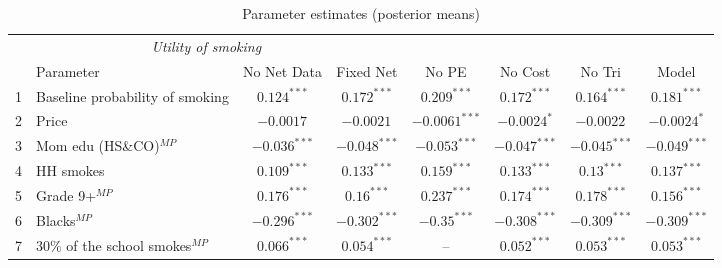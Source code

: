 
\begin{table}[t!]
\begin{center}
\caption{Parameter estimates (posterior means)} \label{tab:estimates}
\hspace*{-1cm}
\begin{small}
\begin{tabular}{llcccccc}
\hline \hline
\multicolumn{4}{c}{\textit{Utility of smoking}}  \\
   & Parameter   & No Net Data   & Fixed Net   & No PE   & No Cost  & No Tri   & Model  \\ \hline
  1 &Baseline probability of smoking          & $0.124^{***}$ & $0.172^{***}$ & $0.209^{***}$ & $0.172^{***}$ & $0.164^{***}$ & $0.181^{***}$ \\ 
  2 &Price                                    &  $-0.0017^{}$ &  $-0.0021^{}$ &$-0.0061^{***}$ & $-0.0024^{*}$ &  $-0.0022^{}$ & $-0.0024^{*}$ \\ 
  3 &Mom edu (HS\&CO)$^{MP}$                  &$-0.036^{***}$ &$-0.048^{***}$ &$-0.053^{***}$ &$-0.047^{***}$ &$-0.045^{***}$ &$-0.049^{***}$ \\ 
  4 &HH smokes                                & $0.109^{***}$ & $0.133^{***}$ & $0.159^{***}$ & $0.133^{***}$ &  $0.13^{***}$ & $0.137^{***}$ \\ 
  5 &Grade 9+$^{MP}$                          & $0.176^{***}$ &  $0.16^{***}$ & $0.237^{***}$ & $0.174^{***}$ & $0.178^{***}$ & $0.156^{***}$ \\ 
  6 &Blacks$^{MP}$                            &$-0.296^{***}$ &$-0.302^{***}$ & $-0.35^{***}$ &$-0.308^{***}$ &$-0.309^{***}$ &$-0.309^{***}$ \\ 
  7 &$30\%$ of the school smokes$^{MP}$       & $0.066^{***}$ & $0.054^{***}$ &            -- & $0.052^{***}$ & $0.053^{***}$ & $0.053^{***}$ \\ 


\end{tabular}
\end{small}
\end{center}
\end{table}
